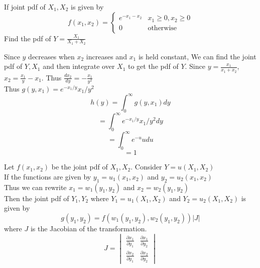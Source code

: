 \documentclass[answers,12pt,addpoints]{exam}
\begin{document}
\begin{example}
    If joint pdf of $X_1, X_2$ is given by
    $$ f(x_1, x_2) = \begin{cases}
        e^{-x_1 - x_2} & x_1 \geq 0, x_2 \geq 0\\
        0 & \text{otherwise}
    \end{cases}$$
    Find the pdf of $Y = \frac{X_1}{X_1 + X_2}$
    \begin{solution}
        Since $y$ decreases when $x_2$ increases and $x_1$ is held constant, We can find the joint pdf of $Y, X_1$ and then integrate over $X_1$ to get the pdf of $Y$.
        Since $y = \frac{x_1}{x_1 + x_2}$, $x_2 = \frac{x_1}{y} - x_1$. Thus 
        $\frac{dx_2}{dy} = -\frac{x_1}{y^2}$\\
        Thus $g(y,x_1) = e^{-x_1/y} x_1/y^2$\\
        $$ h(y) = \int_0^\infty g(y,x_1) dy $$
        $$ = \int_0^\infty e^{-x_1/y} x_1/y^2 dy $$
        $$ = \int_0^\infty e^{-u} u du$$
        $$ = 1$$
    \end{solution}
\end{example}
\begin{theorem}
    Let $f(x_1, x_2)$ be the joint pdf of $X_1, X_2$. Consider $Y = u(X_1, X_2)$ \\
    If the functions are given by $y_1 = u_1(x_1, x_2)$ and $y_2 = u_2(x_1, x_2)$\\
    Thus we can rewrite $x_1 = w_1(y_1, y_2)$ and $x_2 = w_2(y_1, y_2)$\\
    Then the joint pdf of $Y_1, Y_2$ where $Y_1 = u_1(X_1, X_2)$ and $Y_2 = u_2(X_1, X_2)$ is given by
    $$ g(y_1, y_2) = f(w_1(y_1, y_2), w_2(y_1, y_2)) |J|$$
    where $J$ is the Jacobian of the transformation.
    $$ J = \begin{vmatrix}
        \frac{\partial x_1}{\partial y_1} & \frac{\partial x_1}{\partial y_2}\\
        \frac{\partial x_2}{\partial y_1} & \frac{\partial x_2}{\partial y_2}
    \end{vmatrix}$$
\end{theorem}
\end{document}
